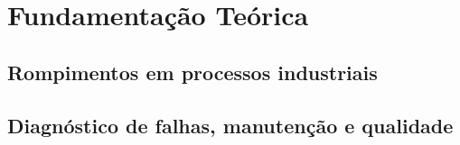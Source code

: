 \chapter{Fundamentação Teórica}
\label{cap:fundamentacao}

%
%


\section{Rompimentos em processos industriais}
\label{sec:rompimentos}



\section{Diagnóstico de falhas, manutenção e qualidade}
\label{sec:diagnostico}



